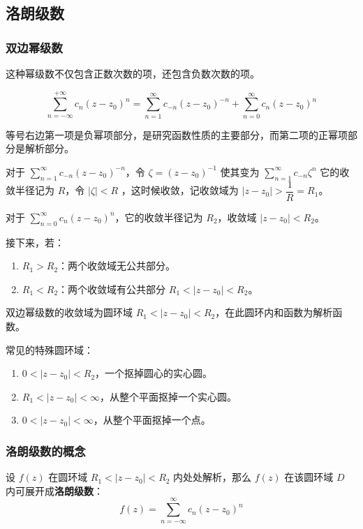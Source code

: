 \subsection{洛朗级数}
\label{洛朗级数}
\subsubsection{双边幂级数}
\label{双边幂级数}
这种幂级数不仅包含正数次数的项，还包含负数次数的项。

\[
\sum_{n=-\infty}^{+\infty} c_n(z-z_0)^n = \sum_{n=1}^{\infty}
c_{-n}(z-z_0)^{-n} + \sum_{n=0}^{\infty} c_{n}(z-z_0)^{n}
\]

等号右边第一项是负幂项部分，是研究函数性质的主要部分，而第二项的正幂项部分是解析部分。

对于 \(\sum\limits_{n=1}^{\infty} c_{-n}(z-z_0)^{-n}\)，令
\(\zeta = (z-z_0)^{-1}\) 使其变为 \(\sum\limits_{n=1}^{\infty} c_{-n} \zeta^{n}\)
它的收敛半径记为 \(R\)，令 \(|\zeta| < R\) ，这时候收敛，记收敛域为
\(|z-z_0| > \dfrac{1}{R} = R_1\)。

对于 \(\sum\limits _{n=0}^{\infty} c_{n}(z-z_0)^{n}\)，它的收敛半径记为
\(R_2\)，收敛域 \(|z-z_0| < R_2\)。

接下来，若：

\begin{enumerate}
\item \(R_1 > R_2\)：两个收敛域无公共部分。
\item \(R_1 < R_2\)：两个收敛域有公共部分 \(R_1 < |z-z_0| < R_2\)。
\end{enumerate}

\begin{tcolorbox}[title={结论},colback=red!5!white
,colframe=red!75!black
,colbacktitle=yellow!50!red
,coltitle=red!25!black, fonttitle=\bfseries,subtitle style={boxrule=0.4pt, colback=yellow!50!red!25!white}]
双边幂级数的收敛域为圆环域
\(R_1 < |z-z_0| < R_2\)，在此圆环内和函数为解析函数。

常见的特殊圆环域：
\begin{enumerate}
\item \(0 < |z-z_0| < R_2\)，一个抠掉圆心的实心圆。
\item \(R_1 < |z-z_0| < \infty\)，从整个平面抠掉一个实心圆。
\item \(0 < |z-z_0| < \infty\)，从整个平面抠掉一个点。
\end{enumerate}

\end{tcolorbox}
\subsubsection{洛朗级数的概念}
\label{洛朗级数的概念}
设 \(f(z)\) 在圆环域 \(R_1 < |z - z_0| < R_2\) 内处处解析，那么 \(f(z)\)
在该圆环域 \(D\) 内可展开成\textbf{洛朗级数}：
\[
f(z) = \sum_{n=-\infty}^{\infty} c_n (z - z_0)^n
\]

